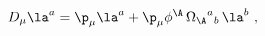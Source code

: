 \begin{equation}
  D_\mu \la^a = \p_\mu \la^a + \p_\mu \phi^\A\, {\Omega_\A}^a{}_b\,
  \la^b\ ,
 \end{equation}


